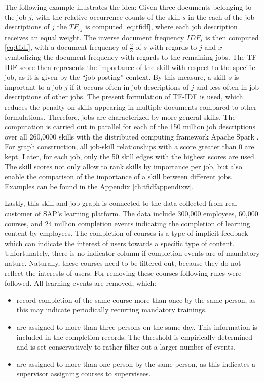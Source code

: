 The following example illustrates the idea:
Given three documents belonging to the job $j$, with the relative occurrence counts of the skill $s$ in the each of the job descriptions of $j$ the $TF_{sj}$ is computed \eqref{eq:tfidf}, where each job description receives an equal weight. The inverse document frequency $IDF_s$ is then computed \eqref{eq:tfidf}, with a document frequency of $\frac{2}{3}$ of $s$ with regards to $j$ and $x$ symbolizing the document frequency with regards to the remaining jobs. The TF-IDF score then represents the importance of the skill with respect to the specific job, as it is given by the “job posting” context. By this measure, a skill $s$ is important to a job $j$ if it occurs often in job descriptions of $j$ and less often in job descriptions of other jobs. The present formulation of TF-IDF is used, which reduces the penalty on skills appearing in multiple documents compared to other formulations. Therefore, jobs are characterized by more general skills. The computation is carried out in parallel for each of the 150 million job descriptions over all 260,0000 skills with the distributed computing framework Apache Spark \parencite{zaharia2016apache}. For graph construction, all job-skill relationships with a score greater than 0 are kept. Later, for each job, only the 50 skill edges with the highest scores are used. The skill scores not only allow to rank skills by importance per job, but also enable the comparison of the importance of a skill between different jobs. Examples can be found in the Appendix \ref{ch:tfidfappendixw}.


Lastly, this skill and job graph is connected to the data collected from real customer of SAP's learning platform. The data include 300,000 employees, 60,000 courses, and 24 million completion events indicating the completion of learning content by employees. The completion of courses is a type of implicit feedback which can indicate the interest of users towards a specific type of content. Unfortunately, there is no indicator column if completion events are of mandatory nature. Naturally, these courses need to be filtered out, because they do not reflect the interests of users. For removing these courses following rules were followed. All learning events are removed, which:
\begin{itemize}
\item record completion of the same course more than once by the same person, as this may indicate periodically recurring mandatory trainings.
\item are assigned to more than three persons on the same day. This information is included in the completion records. The threshold is empirically determined and is set conservatively to rather filter out a larger number of events.
\item are assigned to more than one person by the same person, as this indicates a supervisor assigning courses to supervisees.
\end{itemize}

